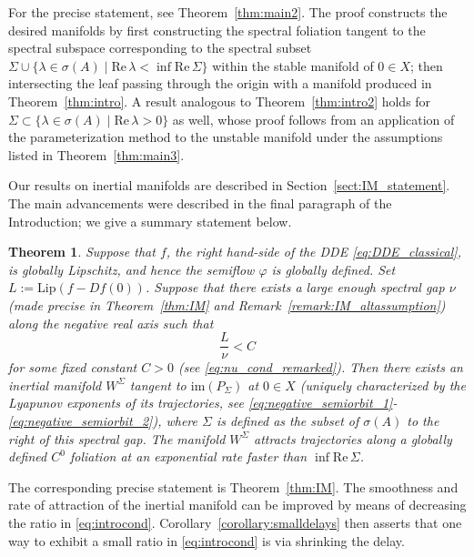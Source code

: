 \documentclass[a4paper, 12pt, oneside, reqno, notitlepage]{amsart}
\theoremstyle{plain}
\newtheorem{theorem}{Theorem}
\theoremstyle{definition}
\theoremstyle{remark}
\newcommand{\im}{\mathrm{im}}
\newcommand{\lip}{\mathrm{Lip}}
\begin{document}
For the precise statement, see Theorem~\ref{thm:main2}. 
The proof constructs the desired manifolds by first constructing the spectral foliation \cite{szalai2020invariant,buza2025smooth} tangent to the spectral subspace corresponding to the spectral subset $\Sigma \cup \{ \lambda \in \sigma(A) \; | \; \mathrm{Re} \, \lambda < \inf \mathrm{Re} \, \Sigma \}$ within the stable manifold of $0 \in X$;
then intersecting the leaf passing through the origin with a manifold produced in Theorem~\ref{thm:intro}.
A result analogous to Theorem~\ref{thm:intro2} holds for  $ \Sigma \subset \{\lambda \in \sigma(A) \; | \; \mathrm{Re } \, \lambda > 0\}$ as well,
whose proof follows from an application of the parameterization method \cite{Cabre2003a} to the unstable manifold under the assumptions listed in Theorem~\ref{thm:main3}. 


Our results on inertial manifolds are described in Section~\ref{sect:IM_statement}.
The main advancements were described in the final paragraph of the Introduction; we give a summary statement below.

\begin{theorem}
    Suppose that $f$, the right hand-side of the DDE \eqref{eq:DDE_classical}, is globally Lipschitz, and hence the semiflow $\varphi$ is globally defined.
    Set $L := \lip(f-Df(0))$.
    Suppose that there exists a large enough spectral gap $\nu$ (made precise in Theorem~\ref{thm:IM} and Remark~\ref{remark:IM_altassumption}) along the negative real axis such that
    \begin{equation}
        \frac{L}{\nu} < C
        \label{eq:introcond}
    \end{equation}
    for some  fixed  constant $C > 0$ (see \eqref{eq:nu_cond_remarked}). 
    Then there exists an inertial manifold $W^\Sigma$ tangent to $\im(P_\Sigma)$ at $0 \in X$ (uniquely characterized by the Lyapunov exponents of its trajectories, see \eqref{eq:negative_semiorbit_1}-\eqref{eq:negative_semiorbit_2}), where $\Sigma$ is defined as the subset of $\sigma(A)$ to the right of this spectral gap.
    The manifold $W^\Sigma$ attracts trajectories along a globally defined $C^0$ foliation at an exponential rate faster than $\inf \mathrm{Re} \, \Sigma$.
\end{theorem}

The corresponding precise statement is Theorem~\ref{thm:IM}.
The smoothness and rate of attraction of the  inertial manifold can be improved by means of decreasing the ratio in \eqref{eq:introcond}.
Corollary~\ref{corollary:smalldelays} then asserts that one way to exhibit a small ratio in \eqref{eq:introcond} is via shrinking the delay.
\end{document}
